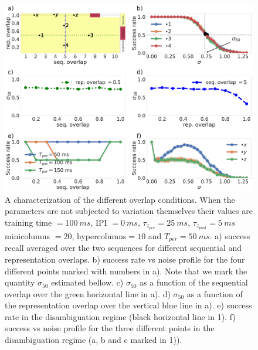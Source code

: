 \documentclass[10pt,a4paper]{article}
\begin{document}
\begin{figure}[H]
\centering
\includegraphics[scale=0.20]{representations.pdf}
\caption{A characterization of the different overlap conditions. When the parameters are not subjected to variation themselves their values are training time $= 100 \: ms$, IPI $= 0 \: ms$, $\tau_{z_{pre}} = 25 \: ms$, $\tau_{z_{post}} = 5 \: ms$ minicolumns $=20$, hypercolumns$=10$ and $T_{per}=50 \: ms$. a) success recall averaged over the two sequences for different sequential and representation overlaps. b) success rate vs noise profile for the four different points marked with numbers in a). Note that we mark the quantity $\sigma_{50}$ estimated bellow. c) $\sigma_{50}$ as a function of the sequential overlap over the green horizontal line in a). d) $\sigma_{50}$ as a function of the representation overlap over the vertical blue line in a). e) success rate in the disambiguation regime (black horizontal line in 1). f) success vs noise profile for the three different points in the disambiguation regime (a, b and c marked in 1)).}
\label{fig:representations}
\end{figure}


%
\end{document}
